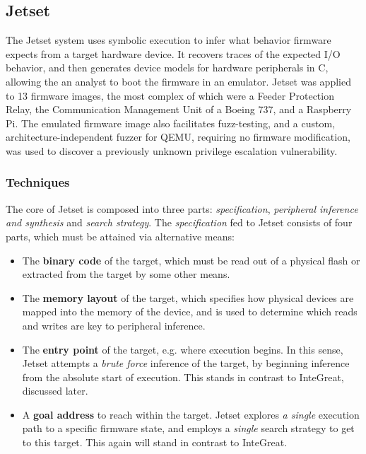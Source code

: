\subsection{Jetset}

The Jetset system uses symbolic execution to infer what behavior firmware expects from a target hardware device.
It recovers traces of the expected I/O behavior, and then generates device models for hardware peripherals in C, allowing the an analyst to boot the firmware in an emulator.
Jetset was applied to 13 firmware images, the most complex of which were a Feeder Protection Relay, the Communication Management Unit of a Boeing 737, and a Raspberry Pi.
The emulated firmware image also facilitates fuzz-testing, and a custom, architecture-independent fuzzer for QEMU, requiring no firmware modification, was used to discover a previously unknown privilege escalation vulnerability.

\subsubsection{Techniques}

The core of Jetset is composed into three parts: \emph{specification}, \emph{peripheral inference and synthesis} and \emph{search strategy}. 
The \emph{specification} fed to Jetset consists of four parts, which must be attained via alternative means:

\begin{itemize}
	\item The \textbf{binary code} of the target, which must be read out of a physical flash or extracted from the target by some other means.
	\item The \textbf{memory layout} of the target, which specifies how physical devices are mapped into the memory of the device, and is used to determine which reads and writes are key to peripheral inference.
	\item The \textbf{entry point} of the target, e.g. where execution begins. In this sense, Jetset attempts a \emph{brute force} inference of the target, by beginning inference from the absolute start of execution. This stands in contrast to InteGreat, discussed later.
	\item A \textbf{goal address} to reach within the target. Jetset explores \emph{a single} execution path to a specific firmware state, and employs a \emph{single} search strategy to get to this target. This again will stand in contrast to InteGreat.
\end{itemize}

